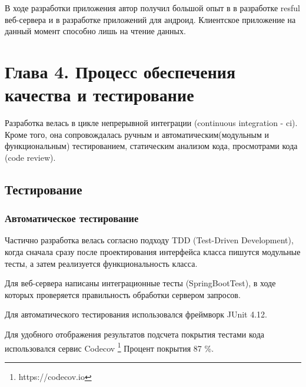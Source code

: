 В ходе разработки приложения автор получил большой опыт в в разработке resful веб-сервера и в разработке приложений для андроид. Клиентское приложение на данный момент способно лишь на чтение данных.

\section*{Глава 4. Процесс обеспечения качества и тестирование}


Разработка велась в цикле непрерывной интеграции (continuous integration - ci). Кроме того, она сопровождалась ручным и автоматическим(модульным и функциональным) тестированием, статическим анализом кода, просмотрами кода (code review).

\subsection*{Тестирование}

\subsubsection*{Автоматическое тестирование}

Частично разработка велась согласно подходу TDD (Test-Driven Development), когда сначала сразу после проектирования интерфейса класса пишутся модульные тесты, а затем реализуется функциональность класса. 

Для веб-сервера написаны интеграционные тесты (SpringBootTest), в ходе которых проверяется правильность обработки сервером запросов.

Для автоматического тестирования использовался фреймворк JUnit 4.12.

Для удобного отображения результатов подсчета покрытия тестами кода использовался сервис Codecov \footnote{https://codecov.io}
Процент покрытия 87 \%.

